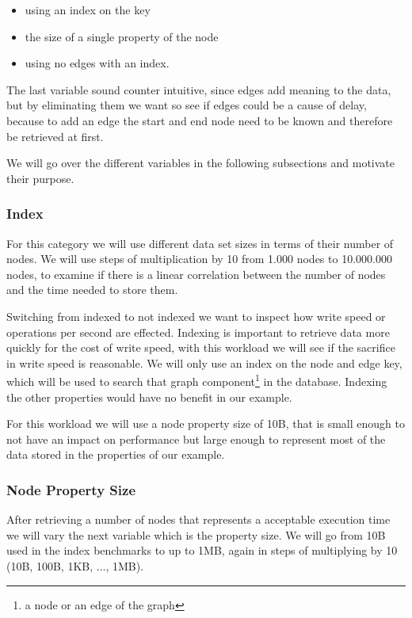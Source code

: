 \begin{itemize}
  \item using an index on the key
  \item the size of a single property of the node
  \item using no edges with an index.
\end{itemize}

The last variable sound counter intuitive,
since edges add meaning to the data,
but by eliminating them we want so see if edges could be a cause of delay,
because to add an edge the start and end node need to be known and therefore be retrieved at first.

We will go over the different variables in the following subsections and motivate their purpose.

\subsubsection{Index}
\label{ch:design:se:index}
For this category we will use different data set sizes in terms of their number of nodes.
We will use steps of multiplication by 10 from 1.000 nodes to 10.000.000 nodes,
to examine if there is a linear correlation between the number of nodes and the time needed to store them.

Switching from indexed to not indexed we want to inspect how write speed or operations per second are effected.
Indexing is important to retrieve data more quickly for the cost of write speed,
with this workload we will see if the sacrifice in write speed is reasonable.
We will only use an index on the node and edge key,
which will be used to search that graph component\footnote{a node or an edge of the graph} in the database.
Indexing the other properties would have no benefit in our example. 

For this workload we will use a node property size of 10B,
that is small enough to not have an impact on performance but large enough to represent most of the data stored in the properties of our example.

\subsubsection{Node Property Size}
\label{ch:design:se:nodePropertySize}
After retrieving a number of nodes that represents a acceptable execution time we will vary the next variable which is the property size.
We will go from 10B used in the index benchmarks to up to 1MB,
again in steps of multiplying by 10 (10B, 100B, 1KB, ..., 1MB).


